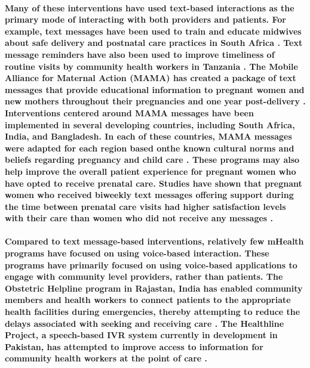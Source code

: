 \paragraph{Many of these interventions have used text-based interactions as the primary mode of interacting with both providers and patients. For example, text messages have been used to train and educate midwives about safe delivery and postnatal care practices in South Africa \citep{Woods2012}. Text message reminders have also been used to improve timeliness of routine visits by community health workers in Tanzania \citep{DeRenzi2012}. The Mobile Alliance for Maternal Action (MAMA) has created a package of text messages that provide educational information to pregnant women and new mothers throughout their pregnancies and one year post-delivery \citep{MAMA}. Interventions centered around MAMA messages have been implemented in several developing countries, including South Africa, India, and Bangladesh. In each of these countries, MAMA messages were adapted for each region based onthe known cultural norms and beliefs regarding pregnancy and child care \citep{McCartney2012}. These programs may also help improve the overall patient experience for pregnant women who have opted to receive prenatal care. Studies have shown that pregnant women who received biweekly text messages offering support during the time between prenatal care visits had higher satisfaction levels with their care than women who did not receive any messages \citep{Jareethum2008}.}

\paragraph{Compared to text message-based interventions, relatively few mHealth programs have focused on using voice-based interaction. These programs have primarily focused on using voice-based applications to engage with community level providers, rather than patients. The Obstetric Helpline program in Rajastan, India has enabled community members and health workers to connect patients to the appropriate health facilities during emergencies, thereby attempting to reduce the delays associated with seeking and receiving care \citep{UNICEF2008}.  The Healthline Project, a speech-based IVR system currently in development in Pakistan, has attempted to improve access to information for community health workers at the point of care \citep{Sherwani2007}. }

